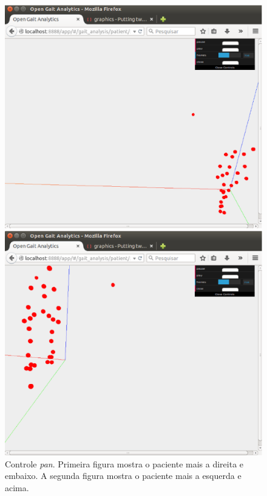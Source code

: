 \begin{figure}[H]
  \centering
  \begin{minipage}[b]{0.49\textwidth}
    \includegraphics[width=\textwidth]{figuras/tela15.eps}
  \end{minipage}
  \hfill
  \begin{minipage}[b]{0.49\textwidth}
    \includegraphics[width=\textwidth]{figuras/tela16.eps}
  \end{minipage}
  \caption[Controle \emph{pan}.]{Controle \emph{pan}. Primeira figura mostra o paciente mais a direita e embaixo. A segunda figura mostra o paciente mais a esquerda e acima.}
  \label{animacao4}
\end{figure}

